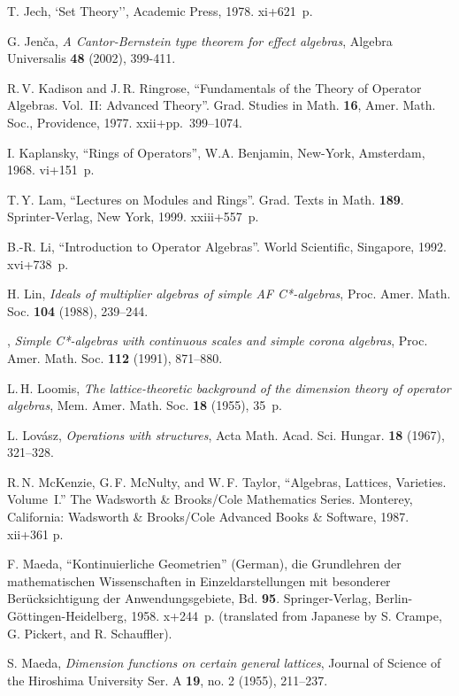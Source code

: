 \documentclass[psamsfonts,reqno]{memo-l}
\theoremstyle{plain}
\theoremstyle{definition}
\theoremstyle{remark}
\numberwithin{equation}{section}
\begin{document}
\begin{thebibliography}{99}
T. Jech, `Set Theory'', Academic Press, 1978. xi+621~p.

G. Jen\v{c}a,
\emph{A Cantor-Bernstein type theorem for effect algebras}, Algebra
Universalis \textbf{48} (2002), 399-411.

R.\,V. Kadison and J.\,R. Ringrose,
``Fundamentals of the Theory of Operator Algebras. Vol.~II:
Advanced Theory''.
Grad. Studies in Math. \textbf{16}, Amer. Math. Soc., Providence, 1977.
xxii+pp.~399--1074.

I. Kaplansky,
``Rings of Operators'',
W.A. Benjamin, New-York, Amsterdam, 1968. vi+151~p.

T.\,Y. Lam,
``Lectures on Modules and Rings''.
Grad. Texts in Math. \textbf{189}. Sprinter-Verlag, New York, 1999.
xxiii+557~p.

B.-R. Li,
``Introduction to Operator Algebras''.
World Scientific, Singapore, 1992. xvi+738~p.

H. Lin,
\emph{Ideals of multiplier algebras of simple AF C*-algebras},
Proc. Amer. Math. Soc. \textbf{104} (1988), 239--244.

\bysame,
\emph{Simple C*-algebras with continuous scales and simple corona
algebras}, Proc. Amer. Math. Soc. \textbf{112} (1991), 871--880.

L.\,H. Loomis,
\emph{The lattice-theoretic background of the dimension
theory of operator algebras},
Mem. Amer. Math. Soc. \textbf{18} (1955), 35~p.

L. Lov\'asz,
\emph{Operations with structures},
Acta Math. Acad. Sci. Hungar. \textbf{18} (1967), 321--328.

R.\,N. McKenzie, G.\,F. McNulty, and W.\,F. Taylor,
``Algebras, Lattices, Varieties. Volume~I.''
The Wadsworth \& Brooks/Cole Mathematics Series.
Monterey, California: Wadsworth \& Brooks/Cole Advanced Books \&
Software, 1987. xii+361 p.

F. Maeda,
``Kontinuierliche Geometrien'' (German), die Grundlehren der
mathematischen  Wissenschaften in Einzeldarstellungen mit
besonderer Ber\"ucksichtigung  der Anwendungsgebiete, Bd.
\textbf{95}. Springer-Verlag,  Berlin-G\"ottingen-Heidelberg, 1958.
x+244~p. (translated from Japanese by S. Crampe, G. Pickert, and
R. Schauffler).

S. Maeda,
\emph{Dimension functions on certain general lattices},
Journal of Science of the Hiroshima University
Ser. A \textbf{19}, no. 2 (1955), 211--237.


\end{thebibliography}
\end{document}
